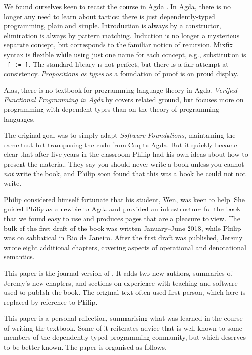 \documentclass[preprint,authoryear]{elsarticle}
\begin{document}
We found ourselves keen to recast the course in Agda \citep{Bove-et-al-2009}.
In Agda, there is
no longer any need to learn about tactics: there is just
dependently-typed programming, plain and simple. Introduction is
always by a constructor, elimination is always by pattern
matching. Induction is no longer a mysterious separate concept, but
corresponds to the familiar notion of recursion. Mixfix syntax is
flexible while using just one name for each concept, e.g.,
substitution is \texttt{\_[\_:=\_]}. The standard library is not perfect, but
there is a fair attempt at consistency. \emph{Propositions as types} as a
foundation of proof is on proud display.

Alas, there is no textbook for programming language theory in
Agda.  \emph{Verified Functional Programming in Agda} by \citep{Stump-2016}
covers related ground, but focuses more on programming with dependent
types than on the theory of programming languages.

The original goal was to simply adapt \emph{Software Foundations},
maintaining the same text but transposing the code from Coq to Agda.
But it quickly became clear that after five years in the
classroom Philip had his own ideas about how to present the material.  They
say you should never write a book unless you cannot \emph{not} write the
book, and Philip soon found that this was a book he could not not
write.

Philip considered himself fortunate that his student, Wen, was
keen to help.  She guided Philip as a newbie to Agda and provided an
infrastructure for the book that we found easy to use and produces
pages that are a pleasure to view.  The bulk of the first draft of the
book was written January--June 2018, while Philip was on sabbatical in
Rio de Janeiro.  After the first draft was published, Jeremy wrote
eight additional chapters, covering aspects of operational and
denotational semantics.

This paper is the journal version of \citet{Wadler-2018}.
It adds two new authors, summaries of Jeremy's new chapters,
and sections on experience with teaching and software
used to publish the book.  The original text often used
first person, which here is replaced by reference to Philip.

This paper is a personal reflection, summarising what was learned in the
course of writing the textbook. Some of it reiterates advice that is
well-known to some members of the dependently-typed programming
community, but which deserves to be better known.  The paper is
organised as follows.
\end{document}
